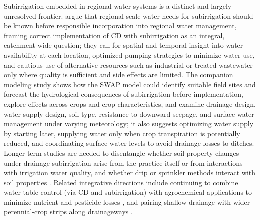 \documentclass[11pt]{article}
\begin{document}
Subirrigation embedded in regional water systems is a distinct and largely unresolved frontier. \textcite{deWit2022} argue that regional-scale water needs for subirrigation should be known before responsible incorporation into regional water management, framing correct implementation of CD with subirrigation as an integral, catchment-wide question; they call for spatial and temporal insight into water availability at each location, optimized pumping strategies to minimize water use, and cautious use of alternative resources such as industrial or treated wastewater only where quality is sufficient and side effects are limited. The companion modeling study \parencite{deWit2024} shows how the SWAP model could identify suitable field sites and forecast the hydrological consequences of subirrigation before implementation, explore effects across crops and crop characteristics, and examine drainage design, water-supply design, soil type, resistance to downward seepage, and surface-water management under varying meteorology; it also suggests optimizing water supply by starting later, supplying water only when crop transpiration is potentially reduced, and coordinating surface-water levels to avoid drainage losses to ditches. Longer-term studies are needed to disentangle whether soil-property changes under drainage-subirrigation arise from the practice itself or from interactions with irrigation water quality, and whether drip or sprinkler methods interact with soil properties \parencite{Kaur2023}. Related integrative directions include continuing to combine water-table control (via CD and subirrigation) with agrochemical applications to minimize nutrient and pesticide losses \parencite{BENGTSON1995}, and pairing shallow drainage with wider perennial-crop strips along drainageways \parencite{Schilling2007}.
\end{document}
